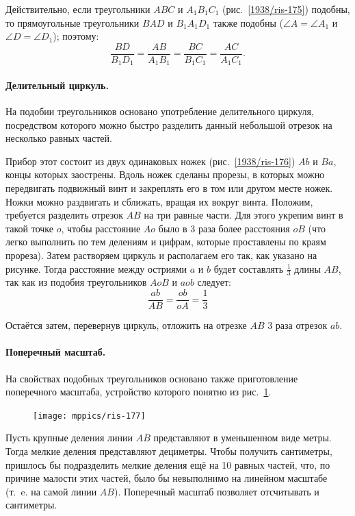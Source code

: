 \documentclass[oneside]{book}
\begin{document}
Действительно, если треугольники $ABC$ и $A_1B_1C_1$ (рис.~\ref{1938/ris-175}) подобны, то прямоугольные треугольники $BAD$ и $B_1A_1D_1$ также подобны ($\angle A = \angle A_1$ и $\angle D=\angle D_1$);
поэтому:
\[\frac{BD}{B_1D_1}=\frac{AB}{A_1B_1}=\frac{BC}{B_1C_1}=\frac{AC}{A_1C_1}.\]

\paragraph{Делительный циркуль.}\label{1938/166} %
На подобии треугольников основано употребление делительного циркуля, посредством которого можно быстро разделить данный небольшой отрезок на несколько равных частей.

Прибор этот состоит из двух одинаковых ножек (рис.~\ref{1938/ris-176}) $Ab$ и $Ba$, концы которых заострены.
Вдоль ножек сделаны прорезы, в которых можно передвигать подвижный винт и закреплять его в том или другом месте ножек.
Ножки можно раздвигать и сближать, вращая их вокруг винта.
Положим, требуется разделить отрезок $AB$ на три равные части.
Для этого укрепим винт в такой точке $o$, чтобы расстояние $Ao$ было в 3 раза более расстояния $oB$ (что легко выполнить по тем делениям и цифрам, которые проставлены по краям прореза).
Затем растворяем циркуль и располагаем его так, как указано на рисунке.
Тогда расстояние между остриями $a$ и $b$ будет составлять $\tfrac13$ длины $AB$, так как из подобия треугольников $AoB$ и $aob$ следует:
\[\frac{ab}{AB}=\frac{ob}{oA}=\frac 1 3\]

Остаётся затем, перевернув циркуль, отложить на отрезке $AB$ 3 раза отрезок $ab$.

\paragraph{Поперечный масштаб.}\label{1938/167}
На свойствах подобных треугольников основано также приготовление поперечного масштаба, устройство которого понятно из рис.~\ref{1938/ris-177}.

\begin{figure}[h!]
\centering
\texttt{[image: mppics/ris-177]}
\caption{}\label{1938/ris-177}
\end{figure}

Пусть крупные деления линии $AB$ представляют в уменьшенном виде метры.
Тогда мелкие деления представляют дециметры.
Чтобы получить сантиметры, пришлось бы подразделить мелкие деления ещё на 10 равных частей, что, по причине малости этих частей, было бы невыполнимо на линейном масштабе (т.~e.
на самой линии $AB$).
Поперечный масштаб позволяет отсчитывать и сантиметры.
\end{document}
